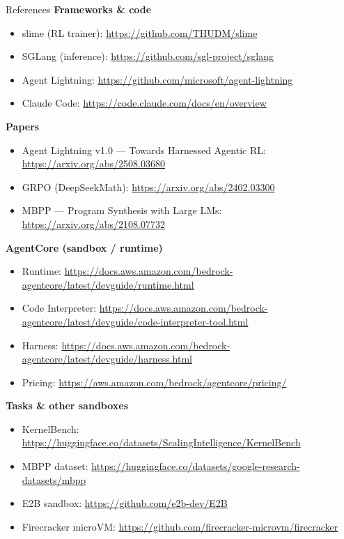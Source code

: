 \documentclass[aspectratio=169]{beamer}
\begin{document}
\begin{frame}[allowframebreaks]{References}
  \scriptsize
  \textbf{Frameworks \& code}
  \begin{itemize}\setlength\itemsep{0.1em}
    \item slime (RL trainer): \url{https://github.com/THUDM/slime}
    \item SGLang (inference): \url{https://github.com/sgl-project/sglang}
    \item Agent Lightning: \url{https://github.com/microsoft/agent-lightning}
    \item Claude Code: \url{https://code.claude.com/docs/en/overview}
  \end{itemize}
  \textbf{Papers}
  \begin{itemize}\setlength\itemsep{0.1em}
    \item Agent Lightning v1.0 --- Towards Harnessed Agentic RL: \url{https://arxiv.org/abs/2508.03680}
    \item GRPO (DeepSeekMath): \url{https://arxiv.org/abs/2402.03300}
    \item MBPP --- Program Synthesis with Large LMs: \url{https://arxiv.org/abs/2108.07732}
  \end{itemize}
  \textbf{AgentCore (sandbox / runtime)}
  \begin{itemize}\setlength\itemsep{0.1em}
    \item Runtime: \url{https://docs.aws.amazon.com/bedrock-agentcore/latest/devguide/runtime.html}
    \item Code Interpreter: \url{https://docs.aws.amazon.com/bedrock-agentcore/latest/devguide/code-interpreter-tool.html}
    \item Harness: \url{https://docs.aws.amazon.com/bedrock-agentcore/latest/devguide/harness.html}
    \item Pricing: \url{https://aws.amazon.com/bedrock/agentcore/pricing/}
  \end{itemize}
  \textbf{Tasks \& other sandboxes}
  \begin{itemize}\setlength\itemsep{0.1em}
    \item KernelBench: \url{https://huggingface.co/datasets/ScalingIntelligence/KernelBench}
    \item MBPP dataset: \url{https://huggingface.co/datasets/google-research-datasets/mbpp}
    \item E2B sandbox: \url{https://github.com/e2b-dev/E2B}
    \item Firecracker microVM: \url{https://github.com/firecracker-microvm/firecracker}

\end{itemize}
\end{frame}
\end{document}
